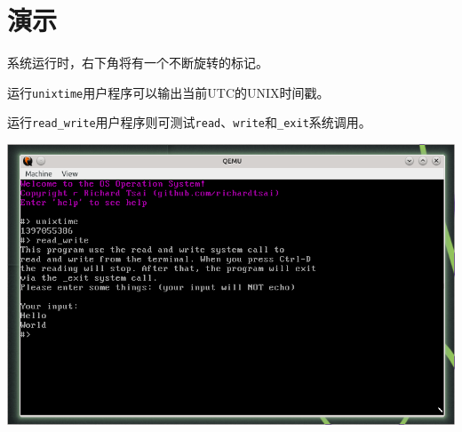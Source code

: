 \documentclass[adobefonts, a4paper]{ctexart}
\begin{document}
\section{演示}
系统运行时，右下角将有一个不断旋转的标记。

运行\verb|unixtime|用户程序可以输出当前UTC的UNIX时间戳。

运行\verb|read_write|用户程序则可测试\verb|read|、\verb|write|和\verb|_exit|系统调用。

\center\includegraphics[scale=0.55]{demo.png}
\end{document}
